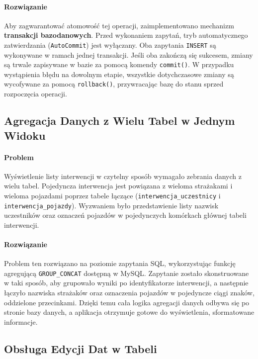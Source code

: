 \paragraph{Rozwiązanie} Aby zagwarantować atomowość tej operacji, zaimplementowano mechanizm \textbf{transakcji bazodanowych}. Przed wykonaniem zapytań, tryb automatycznego zatwierdzania (\texttt{AutoCommit}) jest wyłączany. Oba zapytania \texttt{INSERT} są wykonywane w ramach jednej transakcji. Jeśli oba zakończą się sukcesem, zmiany są trwale zapisywane w bazie za pomocą komendy \texttt{commit()}. W przypadku wystąpienia błędu na dowolnym etapie, wszystkie dotychczasowe zmiany są wycofywane za pomocą \texttt{rollback()}, przywracając bazę do stanu sprzed rozpoczęcia operacji.

\subsection{Agregacja Danych z Wielu Tabel w Jednym Widoku}
\label{ssec:problem_agregacja}

\paragraph{Problem} Wyświetlenie listy interwencji w czytelny sposób wymagało zebrania danych z wielu tabel. Pojedyncza interwencja jest powiązana z wieloma strażakami i wieloma pojazdami poprzez tabele łączące (\texttt{interwencja\_uczestnicy} i \texttt{interwencja\_pojazdy}). Wyzwaniem było przedstawienie listy nazwisk uczestników oraz oznaczeń pojazdów w pojedynczych komórkach głównej tabeli interwencji.

\paragraph{Rozwiązanie} Problem ten rozwiązano na poziomie zapytania SQL, wykorzystując funkcję agregującą \texttt{GROUP\_CONCAT} dostępną w MySQL. Zapytanie zostało skonstruowane w taki sposób, aby grupowało wyniki po identyfikatorze interwencji, a następnie łączyło nazwiska strażaków oraz oznaczenia pojazdów w pojedyncze ciągi znaków, oddzielone przecinkami. Dzięki temu cała logika agregacji danych odbywa się po stronie bazy danych, a aplikacja otrzymuje gotowe do wyświetlenia, sformatowane informacje.

\subsection{Obsługa Edycji Dat w Tabeli}
\label{ssec:problem_daty}

